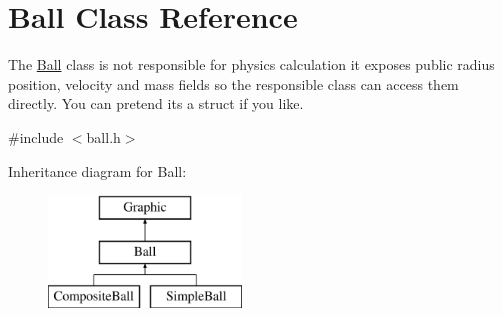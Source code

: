 \hypertarget{class_ball}{}\section{Ball Class Reference}
\label{class_ball}


The \mbox{\hyperlink{class_ball}{Ball}} class is not responsible for physics calculation it exposes public radius position, velocity and mass fields so the responsible class can access them directly. You can pretend it\textquotesingle{}s a struct if you like.  




{\ttfamily \#include $<$ball.\+h$>$}

Inheritance diagram for Ball\+:\begin{figure}[H]
\begin{center}
\leavevmode
\includegraphics[height=3.000000cm]{class_ball}
\end{center}
\end{figure}

